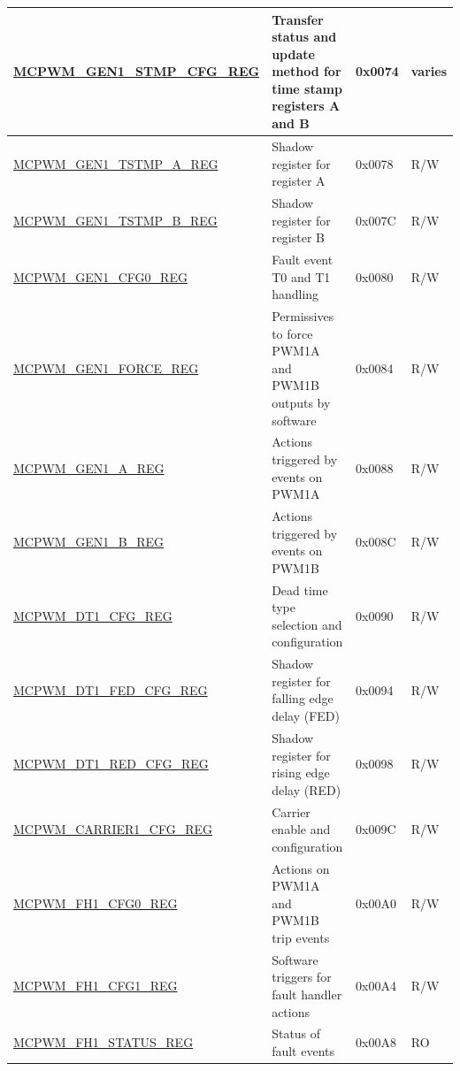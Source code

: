 \begin{longtable}{ | p{6cm} | p{7.2cm} | p{1.3cm} | p{1cm} | }
\hyperref[regdesc:MCPWMGEN1STMPCFGREG]{MCPWM\_GEN1\_STMP\_CFG\_REG} & Transfer status and update method for time stamp registers A and B & 0x0074 & varies \\ \hline
\hyperref[regdesc:MCPWMGEN1TSTMPAREG]{MCPWM\_GEN1\_TSTMP\_A\_REG} & Shadow register for register A & 0x0078 & R/W \\ \hline
\hyperref[regdesc:MCPWMGEN1TSTMPBREG]{MCPWM\_GEN1\_TSTMP\_B\_REG} & Shadow register for register B & 0x007C & R/W \\ \hline
\hyperref[regdesc:MCPWMGEN1CFG0REG]{MCPWM\_GEN1\_CFG0\_REG} & Fault event T0 and T1 handling & 0x0080 & R/W \\ \hline
\hyperref[regdesc:MCPWMGEN1FORCEREG]{MCPWM\_GEN1\_FORCE\_REG} & Permissives to force PWM1A and PWM1B outputs by software & 0x0084 & R/W \\ \hline
\hyperref[regdesc:MCPWMGEN1AREG]{MCPWM\_GEN1\_A\_REG} & Actions triggered by events on PWM1A & 0x0088 & R/W \\ \hline
\hyperref[regdesc:MCPWMGEN1BREG]{MCPWM\_GEN1\_B\_REG} & Actions triggered by events on PWM1B & 0x008C & R/W \\ \hline
\hyperref[regdesc:MCPWMDT1CFGREG]{MCPWM\_DT1\_CFG\_REG} & Dead time type selection and configuration & 0x0090 & R/W \\ \hline
\hyperref[regdesc:MCPWMDT1FEDCFGREG]{MCPWM\_DT1\_FED\_CFG\_REG} & Shadow register for falling edge delay (FED) & 0x0094 & R/W \\ \hline
\hyperref[regdesc:MCPWMDT1REDCFGREG]{MCPWM\_DT1\_RED\_CFG\_REG} & Shadow register for rising edge delay (RED) & 0x0098 & R/W \\ \hline
\hyperref[regdesc:MCPWMCARRIER1CFGREG]{MCPWM\_CARRIER1\_CFG\_REG} & Carrier enable and configuration & 0x009C & R/W \\ \hline
\hyperref[regdesc:MCPWMFH1CFG0REG]{MCPWM\_FH1\_CFG0\_REG} & Actions on PWM1A and PWM1B trip events & 0x00A0 & R/W \\ \hline
\hyperref[regdesc:MCPWMFH1CFG1REG]{MCPWM\_FH1\_CFG1\_REG} & Software triggers for fault handler actions & 0x00A4 & R/W \\ \hline
\hyperref[regdesc:MCPWMFH1STATUSREG]{MCPWM\_FH1\_STATUS\_REG} & Status of fault events & 0x00A8 & RO \\ \hline


\end{longtable}
